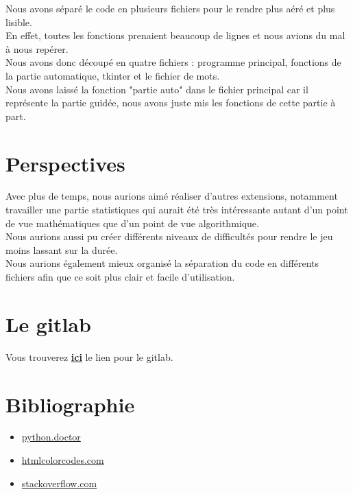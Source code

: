 \documentclass[french,10pt,a4paper]{article}	%
\begin{document}
	Nous avons séparé le code en plusieurs fichiers pour le rendre plus aéré et plus lisible.\\
	En effet, toutes les fonctions prenaient beaucoup de lignes et nous avions du mal à nous repérer.\\
	Nous avons donc découpé en quatre fichiers : programme principal, fonctions de la partie automatique, tkinter et le fichier de mots.\\
	Nous avons laissé la fonction "partie auto" dans le fichier principal car il représente la partie guidée, nous avons juste mis les fonctions de cette partie à part.


\section{Perspectives}
	
	Avec plus de temps, nous aurions aimé réaliser d'autres extensions, notamment travailler une partie statistiques qui aurait été très intéressante autant d'un point de vue mathématiques que d'un point de vue algorithmique.\\
	Nous aurions aussi pu créer différents niveaux de difficultés pour rendre le jeu moins lassant sur la durée.\\
	Nous aurions également mieux organisé la séparation du code en différents fichiers afin que ce soit plus clair et facile d'utilisation.	

\section{Le gitlab}
Vous trouverez \href{https://gitlab.com/de-weerdt-baldassin/le-pendu}{\textbf{ici}} le lien pour le gitlab. %

\section{Bibliographie}

\begin{itemize}
\item \href{https://python.doctor/page-tkinter-interface-graphique-python-tutoriel}{python.doctor} 
\item \href{https://htmlcolorcodes.com/fr/}{htmlcolorcodes.com} %
\item \href{https://stackoverflow.com/questions/42828416/print-output-in-gui-interface-tkinter-python}{stackoverflow.com}
\end{itemize}
\end{document}
